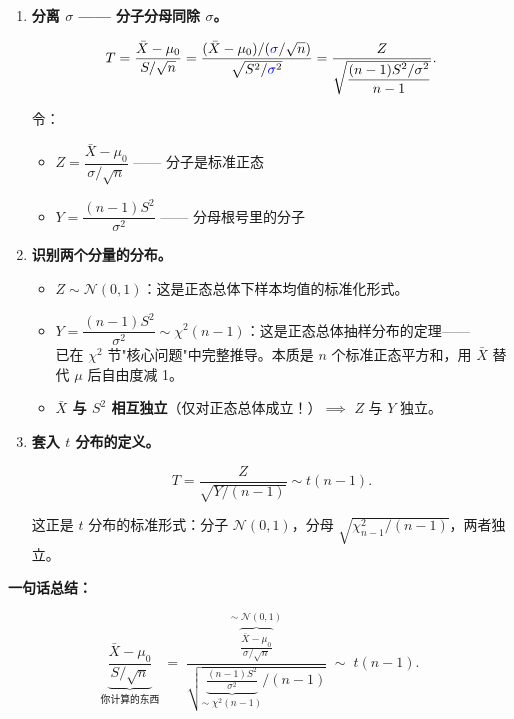 \begin{enumerate}[label=\textbf{第 \arabic* 步}, leftmargin=*]

    \item \textbf{分离 $\sigma$ —— 分子分母同除 $\sigma$。}

    \begin{equation}
        T = \frac{\bar{X} - \mu_0}{S / \sqrt{n}}
          = \frac{(\bar{X} - \mu_0) / (\textcolor{blue}{\sigma} / \sqrt{n})}
                 {\sqrt{S^2 / \textcolor{blue}{\sigma}^2}}
          = \frac{Z}{\sqrt{\dfrac{(n-1)S^2 / \sigma^2}{n-1}}}.
    \end{equation}

    令：
    \begin{itemize}
        \item $Z = \dfrac{\bar{X} - \mu_0}{\sigma / \sqrt{n}}$ —— 分子是标准正态
        \item $Y = \dfrac{(n-1)S^2}{\sigma^2}$ —— 分母根号里的分子
    \end{itemize}

    \item \textbf{识别两个分量的分布。}

    \begin{itemize}
        \item $Z \sim \mathcal{N}(0,1)$：这是正态总体下样本均值的标准化形式。
        \item $Y = \dfrac{(n-1)S^2}{\sigma^2} \sim \chi^2(n-1)$：这是正态总体抽样分布的定理——\\
        已在 $\chi^2$ 节"核心问题"中完整推导。本质是 $n$ 个标准正态平方和，用 $\bar{X}$ 替代 $\mu$ 后自由度减 1。
        \item \textbf{$\bar{X}$ 与 $S^2$ 相互独立}（仅对正态总体成立！）$\implies$ $Z$ 与 $Y$ 独立。
    \end{itemize}

    \item \textbf{套入 $t$ 分布的定义。}

    \begin{equation}
        T = \frac{Z}{\sqrt{Y / (n-1)}} \sim t(n-1).
    \end{equation}

    这正是 $t$ 分布的标准形式：分子 $\mathcal{N}(0,1)$，分母 $\sqrt{\chi^2_{n-1} / (n-1)}$，两者独立。

\end{enumerate}

\medskip
\textbf{一句话总结：}

\[
\underbrace{\frac{\bar{X} - \mu_0}{S / \sqrt{n}}}_{\text{你计算的东西}}
\;=\;
\frac{
    \overbrace{\frac{\bar{X} - \mu_0}{\sigma / \sqrt{n}}}^{\sim\; \mathcal{N}(0,1)}
}{
    \sqrt{
        \underbrace{\frac{(n-1)S^2}{\sigma^2}}_{\sim\; \chi^2(n-1)}
        \Big/ (n-1)
    }
}
\;\sim\; t(n-1).
\]


